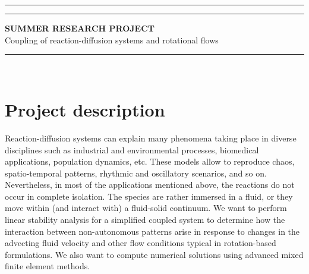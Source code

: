 \documentclass[10pt, a4paper]{article}
\newcommand{\cblue}[1]{\textcolor{lightblue}{#1}}
\begin{document}
\sf 

\cfoot{}
\chead{}
\lfoot{\cblue{Monash Mathematics}}
\lhead{}
\rfoot{\cblue{C Thomopoulos / R Ruiz Baier}}
\rhead{}
\pagestyle{fancyplain}
\renewcommand{\headrulewidth}{0.0pt}
\begin{center}
\cblue{\hrule depth 0.5pt}
\vspace{-5pt}
\cblue{\hrule}
\vspace{-5pt}
\uppercase{\bfseries {\large S}ummer Research Project}\\
{Coupling of reaction-diffusion systems and rotational flows}\\
\vspace{5pt}
\cblue{\hrule depth 0.5pt}
\vspace{3.0cm}~
\end{center}
\vspace{-3.5cm}

\section*{Project description} 
Reaction-diffusion systems can explain many phenomena taking place in diverse disciplines such as industrial and environmental processes, biomedical applications, population dynamics, etc.  These models allow to reproduce chaos, spatio-temporal patterns, rhythmic and oscillatory scenarios, and so on. Nevertheless, in most of the applications mentioned above, the reactions do not occur in complete isolation. The species are rather immersed in a fluid, or they move within (and interact with) a fluid-solid continuum. We want to perform linear stability analysis for a simplified coupled system to determine how the interaction between non-autonomous patterns arise in response to changes in the advecting fluid velocity and other flow conditions typical in rotation-based formulations. We also want to compute numerical solutions using advanced mixed finite element methods. 
\end{document}
